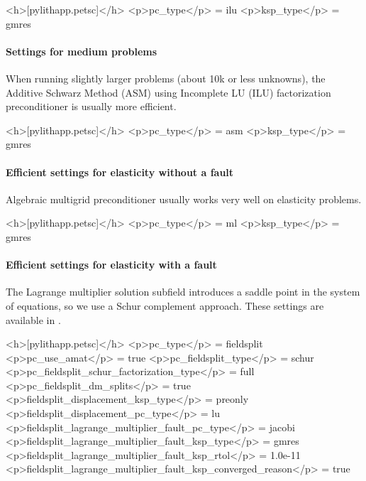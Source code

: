 \begin{cfg}
<h>[pylithapp.petsc]</h>
<p>pc_type</p> = ilu
<p>ksp_type</p> = gmres
\end{cfg}

\paragraph{Settings for medium problems}

When running slightly larger problems (about 10k or less unknowns),
the Additive Schwarz Method (ASM) using Incomplete LU (ILU)
factorization preconditioner is usually more efficient.

\begin{cfg}
<h>[pylithapp.petsc]</h>
<p>pc_type</p> = asm
<p>ksp_type</p> = gmres
\end{cfg}

\paragraph{Efficient settings for elasticity without a fault}

Algebraic multigrid preconditioner usually works very well on
elasticity problems.

\begin{cfg}
<h>[pylithapp.petsc]</h>
<p>pc_type</p> = ml
<p>ksp_type</p> = gmres
\end{cfg}


\paragraph{Efficient settings for elasticity with a fault}

The Lagrange multiplier solution subfield introduces a saddle point in
the system of equations, so we use a Schur complement approach. These
settings are available in
.

\begin{cfg}
<h>[pylithapp.petsc]</h>
<p>pc_type</p> = fieldsplit
<p>pc_use_amat</p> = true
<p>pc_fieldsplit_type</p> = schur
<p>pc_fieldsplit_schur_factorization_type</p> = full
<p>pc_fieldsplit_dm_splits</p> = true
<p>fieldsplit_displacement_ksp_type</p> = preonly
<p>fieldsplit_displacement_pc_type</p> = lu
<p>fieldsplit_lagrange_multiplier_fault_pc_type</p> = jacobi
<p>fieldsplit_lagrange_multiplier_fault_ksp_type</p> = gmres
<p>fieldsplit_lagrange_multiplier_fault_ksp_rtol</p> = 1.0e-11
<p>fieldsplit_lagrange_multiplier_fault_ksp_converged_reason</p> = true
\end{cfg}



